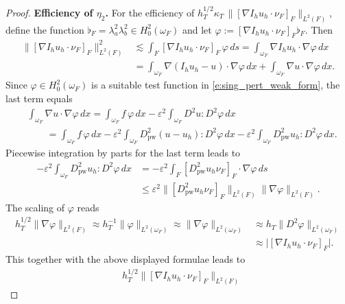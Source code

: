 \documentclass[a4paper]{amsart}
\theoremstyle{definition}
\numberwithin{equation}{section}
\numberwithin{theorem}{section}
\newcommand{\pw}{\mathrm{pw}}
\begin{document}
\begin{proof}
    \textbf{Efficiency of $\eta_2$.}
    For the efficiency of 
    $h_T^{1/2}\kappa_T
    \,\lVert[\nabla I_h u_h\cdot\nu_F]_F\rVert_{L^2(F)}$,
    define the function $\flat_F=\lambda_a^2\lambda_b^2\in H^2_0(\omega_F)$
    and let $\varphi:=[\nabla I_h u_h\cdot\nu_F]_F\flat_F$.
    Then 
    \begin{align*}
        \lVert[\nabla I_h u_h\cdot\nu_F]_F\rVert_{L^2(F)}^2
        & \lesssim \int_F [\nabla I_h u_h\cdot\nu_F]_F \,\varphi\,ds
        = \int_{\omega_F} \nabla I_h u_h \cdot\nabla \varphi\,dx\\
        &= \int_{\omega_F} \nabla (I_h u_h-u) \cdot\nabla \varphi\,dx
          + \int_{\omega_F} \nabla u \cdot\nabla \varphi\,dx.
    \end{align*}
    Since $\varphi\in H^2_0(\omega_F)$ is a suitable test function
    in \eqref{e:sing_pert_weak_form}, the
    last term equals 
    \begin{align*}
        &\int_{\omega_F} \nabla u \cdot\nabla \varphi\,dx
         = \int_{\omega_F} f \,\varphi\,dx
           - \varepsilon^2 \int_{\omega_F} D^2 u :D^2\varphi\,dx\\
        &\qquad
        = \int_{\omega_F} f \,\varphi\,dx
           - \varepsilon^2 \int_{\omega_F} D^2_\pw (u-u_h) :D^2\varphi\,dx
           - \varepsilon^2 \int_{\omega_F} D^2_\pw u_h :D^2\varphi\,dx
           .
    \end{align*}
    Piecewise integration by parts for the last term leads to 
    \begin{align*}
        - \varepsilon^2 \int_{\omega_F} D^2_\pw u_h :D^2\varphi\,dx
        &= -\varepsilon^2 \int_F [D^2_\pw u_h \nu_F]_F \cdot \nabla \varphi\,ds\\
        &\leq \varepsilon^2 \lVert [D^2_\pw u_h \nu_F]_F\rVert_{L^2(F)}
           \lVert \nabla \varphi\rVert_{L^2(F)}.
    \end{align*}
    The scaling of $\varphi$ reads 
    \begin{align*}
        h_T^{1/2}\lVert \nabla \varphi\rVert_{L^2(F)}
        \approx
        h_T^{-1}\lVert \varphi\rVert_{L^2(\omega_F)}
        \approx
        \lVert \nabla \varphi\rVert_{L^2(\omega_F)}
        &\approx
        h_T\lVert D^2\varphi\rVert_{L^2(\omega_F)}\\
        &\approx 
        \lvert [\nabla I_h u_h\cdot\nu_F]_F\rvert .
    \end{align*}
    This together with the above displayed formulae leads to 
    \begin{align*}
        &h_T^{1/2}\lVert[\nabla I_h u_h\cdot\nu_F]_F\rVert_{L^2(F)}

\end{align*}
\end{proof}
\end{document}
